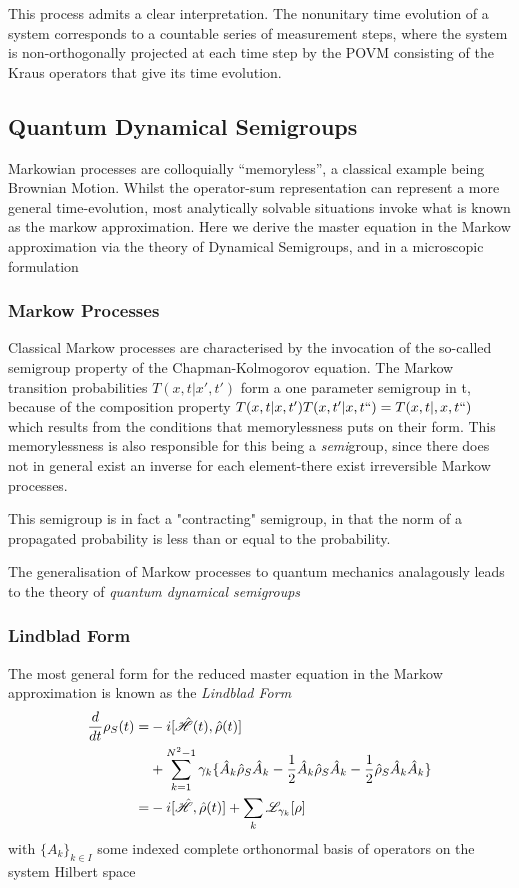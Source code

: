 This process admits a clear interpretation.
The nonunitary time evolution of a system corresponds to a countable series of measurement steps, where the system is non-orthogonally projected at each time step by the POVM consisting of the Kraus operators that give its time evolution.

\subsection{Quantum Dynamical Semigroups}
Markowian processes are colloquially ``memoryless'', a classical example being Brownian Motion.
Whilst the operator-sum representation can represent a more general time-evolution, most analytically solvable situations invoke what is known as the markow approximation.
Here we derive the master equation in the Markow approximation via the theory of Dynamical Semigroups, and in a microscopic formulation

\subsubsection{Markow Processes}
Classical Markow processes are characterised by the invocation of the so-called semigroup property of the Chapman-Kolmogorov equation.
The Markow transition probabilities $T(x, t|x', t')$ form a one parameter semigroup in t, because of the composition property $T(x, t|x, t')T(x, t'|x, t``) = T(x, t|,x, t``)$ which results from the conditions that memorylessness puts on their form.
This memorylessness is also responsible for this being a \emph{semi}group, since there does not in general exist an inverse for each element-there exist irreversible Markow processes.

This semigroup is in fact a "contracting" semigroup, in that the norm of a propagated probability is less than or equal to the probability.

The generalisation of Markow processes to quantum mechanics analagously leads to the theory of \emph{quantum dynamical semigroups}

\subsubsection{Lindblad Form}
The most general form \cite[119--122]{Breuer2002} for the reduced master equation in the Markow approximation is known as the \emph{Lindblad Form}
\begin{align}
        \frac{d}{dt} \rho_S (t) =& -i[\hat{\mathscr{H}} (t), \hat{\rho} (t)\notag]\\
                                 & + \sum_{k=1}^{N^2-1} \gamma_k \{ \hat{A}_k \hat{\rho}_S \hat{A}_k -\frac{1}{2}  \hat{A}_k \hat{\rho}_S \hat{A}_k -\frac{1}{2} \hat{\rho}_S \hat{A}_k \hat{A}_k \}\\
        = & -i[\hat{\mathscr{H}}, \hat{\rho}(t)]+ \sum_k \mathscr{L}_{\gamma_{k}} [\rho]
\end{align}
with ${\{A_k\}}_{k \in I}$ some indexed complete orthonormal basis of operators on the system Hilbert space

